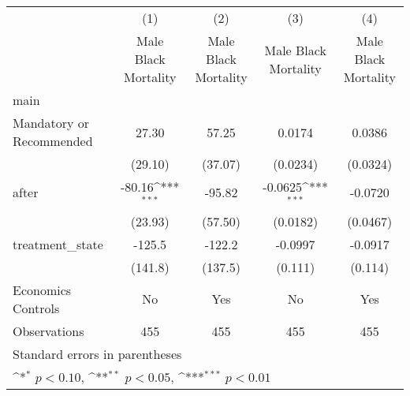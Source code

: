 {
\def\sym#1{\ifmmode^{#1}\else\(^{#1}\)\fi}
\begin{longtable}{l*{4}{c}}
\hline\hline\endfirsthead\hline\endhead\hline\endfoot\endlastfoot
                    &\multicolumn{1}{c}{(1)}&\multicolumn{1}{c}{(2)}&\multicolumn{1}{c}{(3)}&\multicolumn{1}{c}{(4)}\\
                    &\multicolumn{1}{c}{Male Black Mortality}&\multicolumn{1}{c}{Male Black Mortality}&\multicolumn{1}{c}{Male Black Mortality}&\multicolumn{1}{c}{Male Black Mortality}\\
\hline
main                &                     &                     &                     &                     \\
Mandatory or Recommended&       27.30         &       57.25         &      0.0174         &      0.0386         \\
                    &     (29.10)         &     (37.07)         &    (0.0234)         &    (0.0324)         \\
[1em]
after               &      -80.16\sym{***}&      -95.82         &     -0.0625\sym{***}&     -0.0720         \\
                    &     (23.93)         &     (57.50)         &    (0.0182)         &    (0.0467)         \\
[1em]
treatment\_state     &      -125.5         &      -122.2         &     -0.0997         &     -0.0917         \\
                    &     (141.8)         &     (137.5)         &     (0.111)         &     (0.114)         \\
[1em]
Economics Controls  &          No         &         Yes         &          No         &         Yes         \\
\hline
Observations        &         455         &         455         &         455         &         455         \\
\hline\hline
\multicolumn{5}{l}{\footnotesize Standard errors in parentheses}\\
\multicolumn{5}{l}{\footnotesize \sym{*} \(p<0.10\), \sym{**} \(p<0.05\), \sym{***} \(p<0.01\)}\\
\end{longtable}
}
